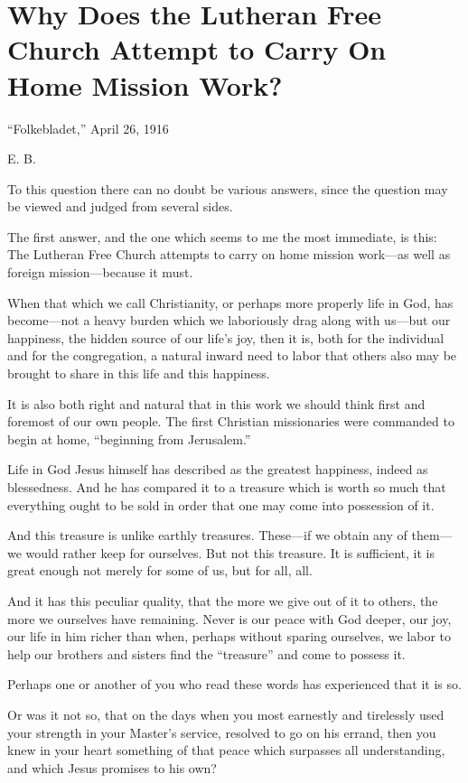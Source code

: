 
\section{Why Does the Lutheran Free Church Attempt to Carry On Home Mission Work?}

“Folkebladet,” April 26, 1916

E. B.

To this question there can no doubt be various answers, since the question may be viewed and judged from several sides.

The first answer, and the one which seems to me the most immediate, is this: The Lutheran Free Church attempts to carry on home mission work—as well as foreign mission—because it must.

When that which we call Christianity, or perhaps more properly life in God, has become—not a heavy burden which we laboriously drag along with us—but our happiness, the hidden source of our life’s joy, then it is, both for the individual and for the congregation, a natural inward need to labor that others also may be brought to share in this life and this happiness.

It is also both right and natural that in this work we should think first and foremost of our own people. The first Christian missionaries were commanded to begin at home, “beginning from Jerusalem.”

Life in God Jesus himself has described as the greatest happiness, indeed as blessedness. And he has compared it to a treasure which is worth so much that everything ought to be sold in order that one may come into possession of it.

And this treasure is unlike earthly treasures. These—if we obtain any of them—we would rather keep for ourselves. But not this treasure. It is sufficient, it is great enough not merely for some of us, but for all, all.

And it has this peculiar quality, that the more we give out of it to others, the more we ourselves have remaining. Never is our peace with God deeper, our joy, our life in him richer than when, perhaps without sparing ourselves, we labor to help our brothers and sisters find the “treasure” and come to possess it.

Perhaps one or another of you who read these words has experienced that it is so.

Or was it not so, that on the days when you most earnestly and tirelessly used your strength in your Master’s service, resolved to go on his errand, then you knew in your heart something of that peace which surpasses all understanding, and which Jesus promises to his own?

